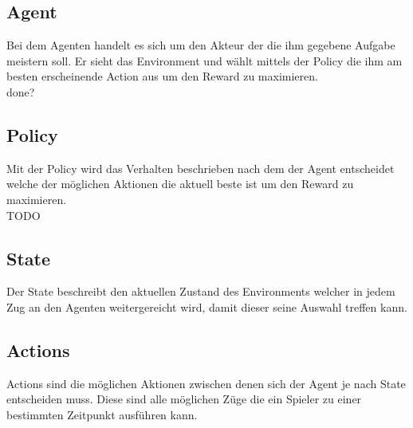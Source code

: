 \subsection{Agent}
Bei dem Agenten handelt es sich um den Akteur der die ihm gegebene Aufgabe meistern soll. Er sieht das Environment und wählt mittels der Policy die ihm am besten erscheinende Action aus um den Reward zu maximieren.\\
\colorbox{red!30}{done?}

\subsection{Policy}
Mit der Policy wird das Verhalten beschrieben nach dem der Agent entscheidet welche der möglichen Aktionen die aktuell beste ist um den Reward zu maximieren.\\
\colorbox{red!30}{TODO} %

\subsection{State}
Der State beschreibt den aktuellen Zustand des Environments welcher in jedem Zug  an den Agenten weitergereicht wird, damit dieser seine Auswahl treffen kann. 

\subsection{Actions}
Actions sind die möglichen Aktionen zwischen denen sich der Agent je nach State entscheiden muss. Diese sind alle möglichen Züge die ein Spieler zu einer bestimmten Zeitpunkt ausführen kann.

